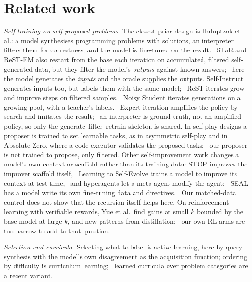
\section{Related work}\label{sec:related}

\emph{Self-training on self-proposed problems.} The closest prior design is Haluptzok et al.: a model
synthesises programming problems with solutions, an interpreter filters them for correctness, and the
model is fine-tuned on the result.~\citep{haluptzok2022} STaR and ReST-EM also restart from the
base each iteration on accumulated, filtered self-generated data, but they filter the model's
\emph{outputs} against known answers;~\citep{star2022,restem2023} here the model generates
the \emph{inputs} and the oracle supplies the outputs. Self-Instruct generates inputs too, but labels them
with the same model;~\citep{selfinstruct2022} ReST iterates grow and improve steps on filtered
samples.~\citep{rest2023} Noisy Student iterates generations on a growing pool, with a teacher's
labels.~\citep{noisystudent2019} Expert iteration amplifies the policy by search and imitates
the result;~\citep{exit2017} an interpreter is ground truth, not an amplified policy, so only the
generate--filter--retrain skeleton is shared. In self-play designs a proposer is trained to set
learnable tasks, as in asymmetric self-play and in Absolute Zero, where a code executor validates the
proposed tasks;~\citep{asymselfplay2017,absolutezero2025} our proposer is not trained to
propose, only filtered. Other self-improvement work changes a model's own context or scaffold rather than
its training data: STOP improves the improver scaffold itself,~\citep{stop2023} Learning to
Self-Evolve trains a model to improve its context at test time,~\citep{lse2026} and hyperagents
let a meta agent modify the agent;~\citep{hyperagents2026} SEAL has a model write its own
fine-tuning data and directives.~\citep{seal2025} Our matched-data control does not show that the
recursion itself helps here. On reinforcement learning with verifiable rewards, Yue et al.\ find gains at
small $k$ bounded by the base model at large $k$, and new patterns from distillation;~\citep{rlvrbound2025}
our own RL arms are too narrow to add to that question.

\emph{Selection and curricula.} Selecting what to label is active learning, here by query synthesis with
the model's own disagreement as the acquisition function; ordering by difficulty is curriculum
learning;~\citep{settles2012,curriculum2009} learned curricula over problem categories are a
recent variant.~\citep{sec2025}


